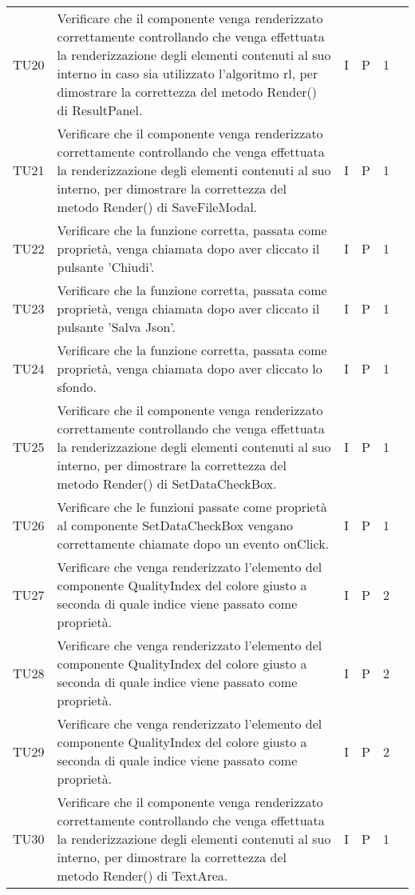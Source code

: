 \begin{longtable} {
		>{}p{12mm}
		>{}p{79.5mm}
		>{}p{9mm}
		>{}p{8mm}
		>{}p{14mm}
		>{}p{0mm}}
	TU20		& Verificare che il componente venga renderizzato correttamente controllando che venga effettuata la renderizzazione degli elementi contenuti al suo interno in caso sia utilizzato l'algoritmo rl, per dimostrare la correttezza del metodo Render() di ResultPanel. & I & P & 1 & \TBstrut \\ [2mm]
	TU21		& Verificare che il componente venga renderizzato correttamente controllando che venga effettuata la renderizzazione degli elementi contenuti al suo interno, per dimostrare la correttezza del metodo Render() di SaveFileModal. & I & P & 1 & \TBstrut \\ [2mm]
	TU22		& Verificare che la funzione corretta, passata come proprietà, venga chiamata dopo aver cliccato il pulsante 'Chiudi'. & I & P & 1 & \TBstrut \\ [2mm]
	TU23		& Verificare che la funzione corretta, passata come proprietà, venga chiamata dopo aver cliccato il pulsante 'Salva Json'. & I & P & 1 & \TBstrut \\ [2mm]
	TU24		& Verificare che la funzione corretta, passata come proprietà, venga chiamata dopo aver cliccato lo sfondo. & I & P & 1 & \TBstrut \\ [2mm]
	TU25		& Verificare che il componente venga renderizzato correttamente controllando che venga effettuata la renderizzazione degli elementi contenuti al suo interno, per dimostrare la correttezza del metodo Render() di SetDataCheckBox. & I & P & 1 & \TBstrut \\ [2mm]
	TU26		& Verificare che le funzioni passate come proprietà al componente SetDataCheckBox vengano correttamente chiamate dopo un evento onClick. & I & P & 1 & \TBstrut \\ [2mm]
	TU27		& Verificare che venga renderizzato l'elemento del componente QualityIndex del colore giusto a seconda di quale indice viene passato come proprietà. & I & P & 2 & \TBstrut \\ [2mm]
	TU28		& Verificare che venga renderizzato l'elemento del componente QualityIndex del colore giusto a seconda di quale indice viene passato come proprietà. & I & P & 2 & \TBstrut \\ [2mm]
	TU29		& Verificare che venga renderizzato l'elemento del componente QualityIndex del colore giusto a seconda di quale indice viene passato come proprietà. & I & P & 2 & \TBstrut \\ [2mm]
	TU30		& Verificare che il componente venga renderizzato correttamente controllando che venga effettuata la renderizzazione degli elementi contenuti al suo interno, per dimostrare la correttezza del metodo Render() di TextArea. & I & P & 1 & \TBstrut \\ [2mm]

\end{longtable}
